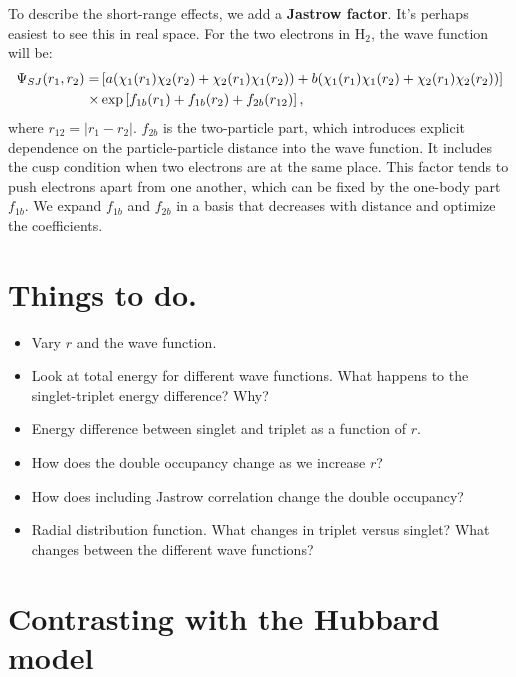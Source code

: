 \documentclass[12pt]{article}
\begin{document}
To describe the short-range effects, we add a {\bf Jastrow factor}.
It's perhaps easiest to see this in real space.
For the two electrons in H$_2$, the wave function will be:
\begin{align}
\Psi_{SJ}(r_1,r_2)=&\left[a(\chi_1(r_1)\chi_2(r_2)+\chi_2(r_1)\chi_1(r_2)) + b(\chi_1(r_1)\chi_1(r_2)+\chi_2(r_1)\chi_2(r_2)) \right] \notag \\
\times& \exp\left[f_{1b}(r_1)+f_{1b}(r_2) + f_{2b}(r_{12})\right],
\label{eqn:slater-jastrow}	
\end{align}
where $r_{12}=|r_1-r_2|$. $f_{2b}$ is the two-particle part, which introduces explicit dependence on the particle-particle distance into the wave function.
It includes the cusp condition when two electrons are at the same place. 
This factor tends to push electrons apart from one another, which can be fixed by the one-body part $f_{1b}$. 
We expand $f_{1b}$ and $f_{2b}$ in a basis that decreases with distance and optimize the coefficients. 




\section*{Things to do.}

\begin{itemize}
\item Vary $r$ and the wave function.
\item Look at total energy for different wave functions. What happens to the singlet-triplet energy difference? Why?
\item Energy difference between singlet and triplet as a function of $r$.
\item How does the double occupancy change as we increase $r$?
\item How does including Jastrow correlation change the double occupancy? 
\item Radial distribution function. What changes in triplet versus singlet? What changes between the different wave functions?
\end{itemize}

\section*{Contrasting with the Hubbard model}
\end{document}
